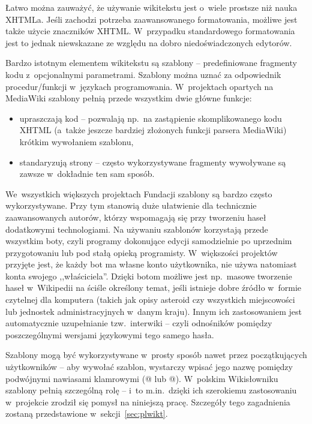 \documentclass{pracamgr}
\begin{document}
Łatwo można zauważyć, że używanie wikitekstu jest o~wiele prostsze niż nauka XHTML\dywiz{}a. Jeśli zachodzi potrzeba zaawansowanego formatowania, możliwe jest także użycie znaczników XHTML. W~przypadku standardowego formatowania jest to jednak niewskazane ze względu na dobro niedoświadczonych edytorów.

Bardzo istotnym elementem wikitekstu są szablony -- predefiniowane fragmenty kodu z~opcjonalnymi parametrami. Szablony można uznać za odpowiednik procedur/funkcji w~językach programowania. W~projektach opartych na MediaWiki szablony pełnią przede wszystkim dwie główne funkcje:
\begin{itemize}
	\item upraszczają kod -- pozwalają np.\ na zastąpienie skomplikowanego kodu XHTML (a~także jeszcze bardziej złożonych funkcji parsera MediaWiki) krótkim wywołaniem szablonu,
	\item standaryzują strony -- często wykorzystywane fragmenty wywoływane są zawsze w~dokładnie ten sam sposób.
\end{itemize}
We~wszystkich większych projektach Fundacji szablony są bardzo często wykorzystywane. Przy tym stanowią duże ułatwienie dla technicznie zaawansowanych autorów, którzy wspomagają się przy tworzeniu haseł dodatkowymi technologiami. Na używaniu szablonów korzystają przede wszystkim boty, czyli programy dokonujące edycji samodzielnie po uprzednim przygotowaniu lub pod stałą opieką programisty. W~większości projektów przyjęte jest, że każdy bot ma własne konto użytkownika, nie używa natomiast konta swojego ,,właściciela''. Dzięki botom możliwe jest np.\ masowe tworzenie haseł w~Wikipedii na ściśle określony temat, jeśli istnieje dobre źródło w~formie czytelnej dla komputera (takich jak opisy asteroid czy wszystkich miejscowości lub jednostek administracyjnych w~danym kraju). Innym ich zastosowaniem jest automatycznie uzupełnianie tzw.\ interwiki -- czyli odnośników pomiędzy poszczególnymi wersjami językowymi tego samego hasła.

Szablony mogą być wykorzystywane w~prosty sposób nawet przez początkujących użytkowników -- aby wywołać szablon, wystarczy wpisać jego nazwę
 pomiędzy podwójnymi nawiasami klamrowymi (@ lub @). W~polskim Wikisłowniku szablony pełnią szczególną rolę -- i~to m.in.\ dzięki ich szerokiemu zastosowaniu w~projekcie zrodził się pomysł na niniejszą pracę. Szczegóły tego zagadnienia zostaną przedstawione w~sekcji~\ref{sec:plwikt}.
\end{document}
